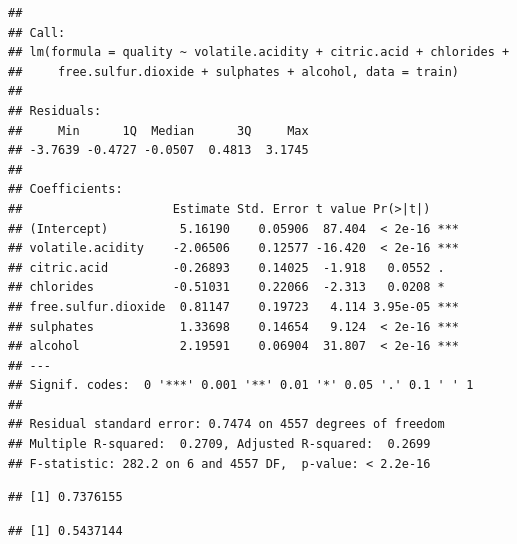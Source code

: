 \documentclass[
]{book}
\newenvironment{Shaded}{\begin{snugshade}}{\end{snugshade}}
\newcommand{\AttributeTok}[1]{\textcolor[rgb]{0.77,0.63,0.00}{#1}}
\newcommand{\FloatTok}[1]{\textcolor[rgb]{0.00,0.00,0.81}{#1}}
\newcommand{\FunctionTok}[1]{\textcolor[rgb]{0.00,0.00,0.00}{#1}}
\newcommand{\NormalTok}[1]{#1}
\newcommand{\OtherTok}[1]{\textcolor[rgb]{0.56,0.35,0.01}{#1}}
\newcommand{\SpecialCharTok}[1]{\textcolor[rgb]{0.00,0.00,0.00}{#1}}
\begin{document}
\begin{verbatim}
## 
## Call:
## lm(formula = quality ~ volatile.acidity + citric.acid + chlorides + 
##     free.sulfur.dioxide + sulphates + alcohol, data = train)
## 
## Residuals:
##     Min      1Q  Median      3Q     Max 
## -3.7639 -0.4727 -0.0507  0.4813  3.1745 
## 
## Coefficients:
##                     Estimate Std. Error t value Pr(>|t|)    
## (Intercept)          5.16190    0.05906  87.404  < 2e-16 ***
## volatile.acidity    -2.06506    0.12577 -16.420  < 2e-16 ***
## citric.acid         -0.26893    0.14025  -1.918   0.0552 .  
## chlorides           -0.51031    0.22066  -2.313   0.0208 *  
## free.sulfur.dioxide  0.81147    0.19723   4.114 3.95e-05 ***
## sulphates            1.33698    0.14654   9.124  < 2e-16 ***
## alcohol              2.19591    0.06904  31.807  < 2e-16 ***
## ---
## Signif. codes:  0 '***' 0.001 '**' 0.01 '*' 0.05 '.' 0.1 ' ' 1
## 
## Residual standard error: 0.7474 on 4557 degrees of freedom
## Multiple R-squared:  0.2709, Adjusted R-squared:  0.2699 
## F-statistic: 282.2 on 6 and 4557 DF,  p-value: < 2.2e-16
\end{verbatim}

\begin{Shaded}
\end{Shaded}

\begin{verbatim}
## [1] 0.7376155
\end{verbatim}

\begin{Shaded}
\end{Shaded}

\begin{verbatim}
## [1] 0.5437144
\end{verbatim}
\end{document}
